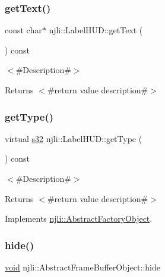 \subsubsection{\texorpdfstring{get\+Text()}{getText()}}
{\footnotesize\ttfamily const char$\ast$ njli\+::\+Label\+H\+U\+D\+::get\+Text (\begin{DoxyParamCaption}{ }\end{DoxyParamCaption}) const}

$<$\#\+Description\#$>$

\begin{DoxyReturn}{Returns}
$<$\#return value description\#$>$ 
\end{DoxyReturn}
\mbox{\label{classnjli_1_1_label_h_u_d_ae798a4d1d06814724cd18c02b6b64a08}} 
\subsubsection{\texorpdfstring{get\+Type()}{getType()}}
{\footnotesize\ttfamily virtual \mbox{\hyperlink{_util_8h_aa62c75d314a0d1f37f79c4b73b2292e2}{s32}} njli\+::\+Label\+H\+U\+D\+::get\+Type (\begin{DoxyParamCaption}{ }\end{DoxyParamCaption}) const\hspace{0.3cm}{\ttfamily [virtual]}}

$<$\#\+Description\#$>$

\begin{DoxyReturn}{Returns}
$<$\#return value description\#$>$ 
\end{DoxyReturn}


Implements \mbox{\hyperlink{classnjli_1_1_abstract_factory_object_a207c86146d40d0794708ae7f2d4e60a7}{njli\+::\+Abstract\+Factory\+Object}}.

\mbox{\label{classnjli_1_1_label_h_u_d_a5d7b8b3bc421084f282343e506a6d289}} 
\subsubsection{\texorpdfstring{hide()}{hide()}}
{\footnotesize\ttfamily \mbox{\hyperlink{_thread_8h_af1e856da2e658414cb2456cb6f7ebc66}{void}} njli\+::\+Abstract\+Frame\+Buffer\+Object\+::hide}

